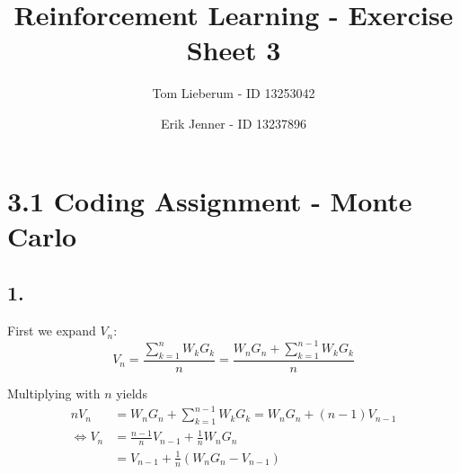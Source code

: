 \documentclass{article}
\title{Reinforcement Learning - Exercise Sheet 3}
\author{Tom Lieberum - ID 13253042 \and Erik Jenner - ID 13237896}
\begin{document}
\maketitle

\section*{3.1 Coding Assignment - Monte Carlo}

\subsection*{1.}

First we expand $V_n$:
\[
V_n = \frac{\sum_{k=1}^n W_kG_k}{n} = \frac{W_nG_n + \sum_{k=1}^{n-1} W_kG_k}{n}
\]

\noindent Multiplying with $n$ yields
\begin{align*}
nV_n &= W_nG_n + \sum_{k=1}^{n-1} W_kG_k = W_nG_n + (n-1) V_{n-1}\\[2mm] \iff V_n &= \frac{n-1}{n} V_{n-1} + \frac{1}{n}W_nG_n\\[2mm] &= V_{n-1} + \frac{1}{n}(W_nG_n - V_{n-1}) 
\end{align*}

\begin{comment}
\section*{3.2 Importance Sampling in Monte Carlo methods}
\subsection*{1. Disadvantage of ordinary IS in off-policy MC}

\subsection*{2. Disadvantage of weighted IS in off-policy MC}
\end{comment}
\end{document}
